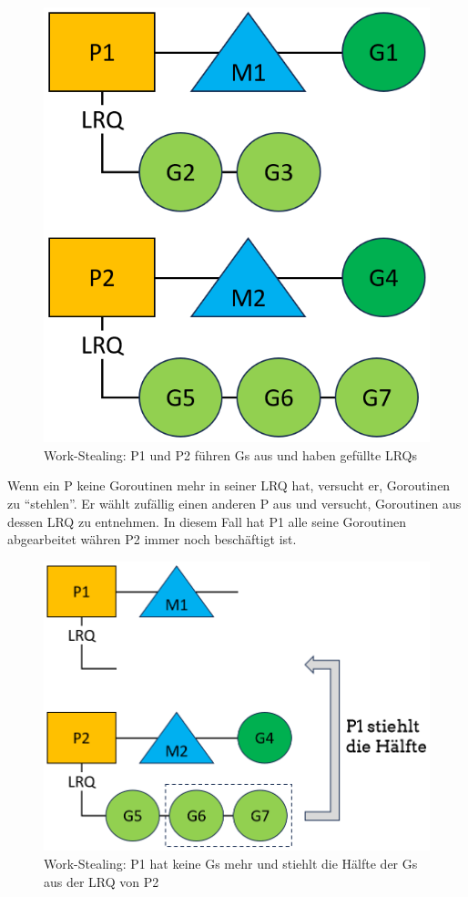 \documentclass[fontsize=12pt,paper=a4,twoside=semi,parskip=half-,headsepline,headinclude]{scrreprt}
\begin{document}
\begin{figure}[H]
	\centering
	\includegraphics[scale=0.5]{figures/GoroutineWorkstealing1.png}
	\caption{Work-Stealing: P1 und P2 führen Gs aus und haben gefüllte LRQs}
	\label{fig:GoroutineWorkstealing1}
\end{figure}

Wenn ein P keine Goroutinen mehr in seiner LRQ hat, versucht er, Goroutinen zu ``stehlen''. Er wählt zufällig einen anderen P aus und versucht, Goroutinen aus dessen LRQ zu entnehmen. In diesem Fall hat P1 alle seine Goroutinen abgearbeitet währen P2 immer noch beschäftigt ist.

\begin{figure}[h]
	\centering
	\includegraphics[scale=0.5]{figures/GoroutineWorkstealing2.png}
	\caption{Work-Stealing: P1 hat keine Gs mehr und stiehlt die Hälfte der Gs aus der LRQ von P2}
	\label{fig:GoroutineWorkstealing2}
\end{figure}
\end{document}
